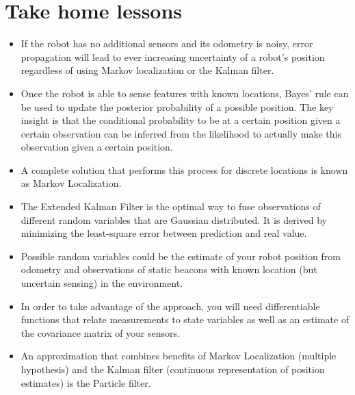 \section*{Take home lessons}
\begin{itemize}
\item If the robot has no additional sensors and its odometry is noisy, error propagation will lead to ever increasing uncertainty of a robot's position regardless of using Markov localization or the Kalman filter.
\item Once the robot is able to sense features with known locations, Bayes' rule can be used to update the posterior probability of a possible position. The key insight is that the conditional probability to be at a certain position given a certain observation can be inferred from the likelihood to actually make this observation given a certain position.
\item A complete solution that performs this process for discrete locations is known as Markov Localization.
\item The Extended Kalman Filter is the optimal way to fuse observations of different random variables that are Gaussian distributed.
It is derived by minimizing the least-square error between prediction and real value.
\item Possible random variables could be the estimate of your robot position from odometry and observations of static beacons with known location (but uncertain sensing) in the environment.
\item In order to take advantage of the approach, you will need differentiable functions that relate measurements to state variables as well as an estimate of the covariance matrix of your sensors.
\item An approximation that combines benefits of Markov Localization (multiple hypothesis) and the Kalman filter (continuous representation of position estimates) is the Particle filter.
\end{itemize}

